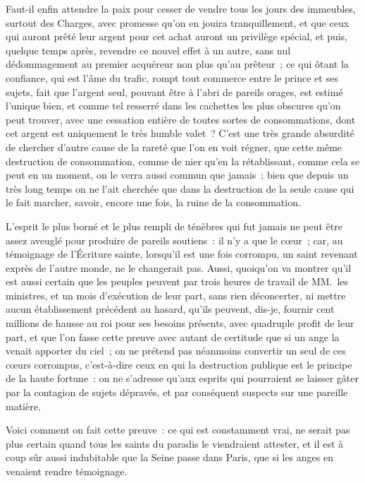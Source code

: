 \documentclass[french,twoside]{book} %
\begin{document}
Faut-il enfin attendre la paix pour cesser de vendre tous les jours des immeubles, surtout des Charges, avec promesse qu’on en jouira tranquillement, et que ceux qui auront prêté leur argent pour cet achat auront un privilège spécial, et puis, quelque temps après, revendre ce nouvel effet à un autre, sans nul dédommagement au premier acquéreur non plus qu’au prêteur ; ce qui ôtant la confiance, qui est l’âme du trafic, rompt tout commerce entre le prince et ses sujets, fait que l’argent seul, pouvant être à l’abri de pareils orages, est estimé l’unique bien, et comme tel resserré dans les cachettes les plus obscures qu’on peut trouver, avec une cessation entière de toutes sortes de consommations, dont cet argent est uniquement le très humble valet ? C’est une très grande absurdité de chercher d’autre cause de la rareté que l’on en voit régner, que cette même destruction de consommation, comme de nier qu’en la rétablissant, comme cela se peut en un moment, on le verra aussi commun que jamais ; bien que depuis un très long temps on ne l’ait cherchée que dans la destruction de la seule cause qui le fait marcher, savoir, encore une fois, la ruine de la consommation.\par
L’esprit le plus borné et le plus rempli de ténèbres qui fut jamais ne peut être assez aveuglé pour produire de pareils soutiens : il n’y a que le cœur ; car, au témoignage de l’Écriture sainte, lorsqu’il est une fois corrompu, un saint revenant exprès de l’autre monde, ne le changerait pas. Aussi, quoiqu’on va montrer qu’il est aussi certain que les peuples peuvent par trois heures de travail de MM. les ministres, et un mois d’exécution de leur part, sans rien déconcerter, ni mettre aucun établissement précédent au hasard, qu’ils peuvent, dis-je, fournir cent millions de hausse au roi pour ses besoins présents, avec quadruple profit de leur part, et que l’on fasse cette preuve avec autant de certitude que si un ange la venait apporter du ciel ; on ne prétend pas néanmoins convertir un seul de ces cœurs corrompus, c’est-à-dire ceux en qui la destruction publique est le principe de la haute fortune : on ne s’adresse qu’aux esprits qui pourraient se laisser gâter par la contagion de sujets dépravés, et par conséquent suspects sur une pareille matière.\par
Voici comment on fait cette preuve : ce qui est constamment vrai, ne serait pas plus certain quand tous les saints du paradis le viendraient attester, et il est à coup sûr aussi indubitable que la Seine passe dans Paris, que si les anges en venaient rendre témoignage.\par
\end{document}
